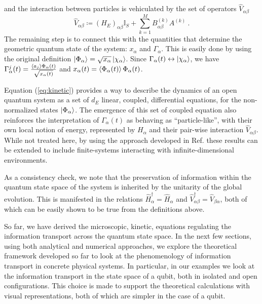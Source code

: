 \documentclass[draft,nofootinbib,pre,twocolumn,showpacs,showkeys,preprintnumbers,floatfix]{revtex4-1}
\newcommand{\1}{\mathbbm{1}}
\begin{document}
and the interaction between particles is vehiculated by the set of operators $\hat{V}_{\alpha \beta}$
\begin{equation}
\hat{V}_{\alpha \beta} \coloneqq \left( H_E\right)_{\alpha \beta} \mathbb{I}_S + \sum_{k=1}^M B^{(k)}_{\alpha \beta} A^{(k)}~.\label{ed:def_V}
\end{equation}
The remaining step is to connect this with the quantities that determine the geometric quantum state of the system: $x_\alpha$ and $\Gamma_\alpha$.
This is easily done by using the original definition $\ket{\Phi_\alpha} = \sqrt{x_\alpha} \ket{\chi_\alpha}$. Since $\Gamma_\alpha(t) \leftrightarrow \ket{\chi_\alpha}$,
we have $\Gamma^j_\alpha(t) = \frac{\braket{a_j}{\Phi_\alpha(t)}}{\sqrt{x_\alpha(t)}}$ and $x_\alpha(t) = \braket{\Phi_\alpha(t)}{\Phi_\alpha(t)}$.


Equation (\ref{eq:kinetic}) provides a way to describe the dynamics of an open 
quantum system as a set of $d_E$ linear, coupled, differential equations, for the 
non-normalized states $\ket{\Phi_\alpha}$. The emergence of this set of coupled 
equation also reinforces the interpretation of $\Gamma_\alpha(t)$ as behaving as 
``particle-like'', with their own local notion of energy, represented by $H_\alpha$ and 
their pair-wise interaction $\hat{V}_{\alpha \beta}$. While not treated here, by using 
the approach developed in Ref.\cite{Anza20a} these results can be extended 
to include finite-systems interacting with infinite-dimensional environments.

As a consistency check, we note that the preservation of information within the 
quantum state space of the system is inherited by the unitarity of the global evolution. 
This is manifested in the relations $\hat{H}_\alpha^\dagger = \hat{H}_\alpha$ and 
$\hat{V}_{\alpha \beta}^{\dagger} = \hat{V}_{\beta \alpha}$, both of which can be 
easily shown to be true from the definitions above.

So far, we have derived the microscopic, kinetic, equations regulating the 
information transport across the quantum state space. In the next few sections, using
both analytical and numerical approaches, we explore the theoretical framework developed
so far to look at the phenomenology of information transport in concrete physical systems. 
In particular, in our examples we look at the information transport in the state 
space of a qubit, both in isolated and open configurations. This choice is made 
to support the theoretical calculations with visual representations, both of which 
are simpler in the case of a qubit.
\end{document}
